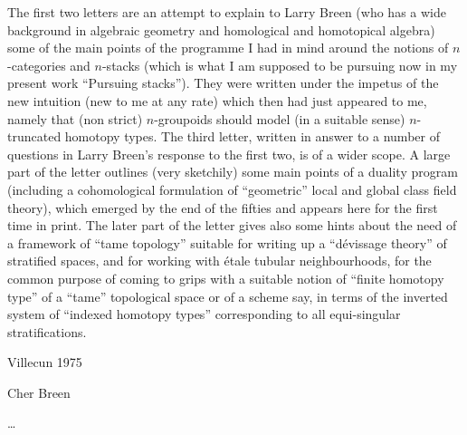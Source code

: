 The first two letters are an attempt to explain to Larry Breen (who has a wide background in algebraic geometry and homological and homotopical algebra) some of the main points of the programme I had in mind around the notions of $n$-categories and $n$-stacks (which is what I am supposed to be pursuing now in my present work ``Pursuing stacks''). They were written under the impetus of the new intuition (new to me at any rate) which then had just appeared to me, namely that (non strict) $n$-groupoids should model (in a suitable sense) $n$-truncated homotopy types. The third letter, written in answer to a number of questions in Larry Breen's response to the first two, is of a wider scope. A large part of the letter outlines (very sketchily) some main points of a duality program (including a cohomological formulation of ``geometric'' local and global class field theory), which emerged by the end of the fifties and appears here for the first time in print. The later part of the letter gives also some hints about the need of a framework of ``tame topology'' suitable for writing up a ``dévissage theory'' of stratified spaces, and for working with étale tubular neighbourhoods, for the common purpose of coming to grips with a suitable notion of ``finite homotopy type'' of a ``tame'' topological space or of a scheme say, in terms of the inverted system of ``indexed homotopy types'' corresponding to all equi-singular stratifications.

\bigskip

\par\hfill Villecun 1975\par

Cher Breen

\dots

\setcounter{section}{0}

